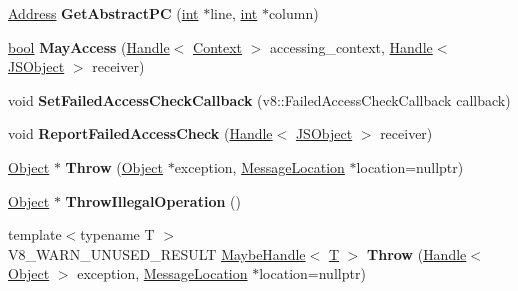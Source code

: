 \begin{DoxyCompactItemize}
\mbox{\hyperlink{classuintptr__t}{Address}} {\bfseries Get\+Abstract\+PC} (\mbox{\hyperlink{classint}{int}} $\ast$line, \mbox{\hyperlink{classint}{int}} $\ast$column)
\item 
\mbox{\label{classv8_1_1internal_1_1Isolate_a81eb739b22c25b62bdab490e2374def0}} 
\mbox{\hyperlink{classbool}{bool}} {\bfseries May\+Access} (\mbox{\hyperlink{classv8_1_1internal_1_1Handle}{Handle}}$<$ \mbox{\hyperlink{classv8_1_1internal_1_1Context}{Context}} $>$ accessing\+\_\+context, \mbox{\hyperlink{classv8_1_1internal_1_1Handle}{Handle}}$<$ \mbox{\hyperlink{classv8_1_1internal_1_1JSObject}{J\+S\+Object}} $>$ receiver)
\item 
\mbox{\label{classv8_1_1internal_1_1Isolate_a38513744361edd89febeaeb7bd77c2a0}} 
void {\bfseries Set\+Failed\+Access\+Check\+Callback} (v8\+::\+Failed\+Access\+Check\+Callback callback)
\item 
\mbox{\label{classv8_1_1internal_1_1Isolate_aff4443be20e188c51cdf69cddc0efad1}} 
void {\bfseries Report\+Failed\+Access\+Check} (\mbox{\hyperlink{classv8_1_1internal_1_1Handle}{Handle}}$<$ \mbox{\hyperlink{classv8_1_1internal_1_1JSObject}{J\+S\+Object}} $>$ receiver)
\item 
\mbox{\label{classv8_1_1internal_1_1Isolate_a62795f687d4c27192868fa639b4b5b03}} 
\mbox{\hyperlink{classv8_1_1internal_1_1Object}{Object}} $\ast$ {\bfseries Throw} (\mbox{\hyperlink{classv8_1_1internal_1_1Object}{Object}} $\ast$exception, \mbox{\hyperlink{classv8_1_1internal_1_1MessageLocation}{Message\+Location}} $\ast$location=nullptr)
\item 
\mbox{\label{classv8_1_1internal_1_1Isolate_a1d294e4525d768e83637f9f49e76d9ee}} 
\mbox{\hyperlink{classv8_1_1internal_1_1Object}{Object}} $\ast$ {\bfseries Throw\+Illegal\+Operation} ()
\item 
\mbox{\label{classv8_1_1internal_1_1Isolate_a255d929cdce87a72c8635de285d9e0eb}} 
{\footnotesize template$<$typename T $>$ }\\V8\+\_\+\+W\+A\+R\+N\+\_\+\+U\+N\+U\+S\+E\+D\+\_\+\+R\+E\+S\+U\+LT \mbox{\hyperlink{classv8_1_1internal_1_1MaybeHandle}{Maybe\+Handle}}$<$ \mbox{\hyperlink{classv8_1_1internal_1_1torque_1_1T}{T}} $>$ {\bfseries Throw} (\mbox{\hyperlink{classv8_1_1internal_1_1Handle}{Handle}}$<$ \mbox{\hyperlink{classv8_1_1internal_1_1Object}{Object}} $>$ exception, \mbox{\hyperlink{classv8_1_1internal_1_1MessageLocation}{Message\+Location}} $\ast$location=nullptr)

\end{DoxyCompactItemize}
